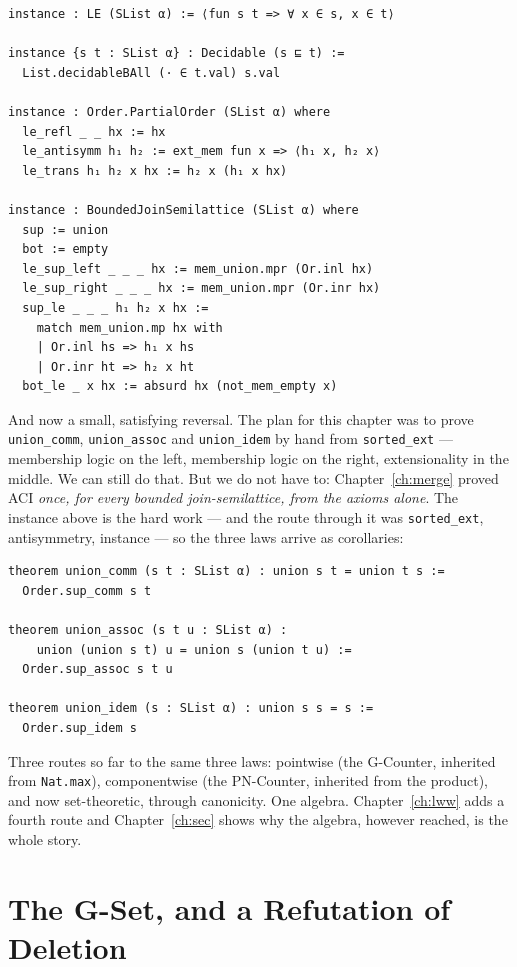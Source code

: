 \documentclass[12pt, a4paper, openright]{book}
\theoremstyle{thmstyle}
\theoremstyle{defstyle}
\newcommand{\lc}[1]{\texttt{#1}}
\begin{document}
\begin{verbatim}
instance : LE (SList α) := ⟨fun s t => ∀ x ∈ s, x ∈ t⟩

instance {s t : SList α} : Decidable (s ⊑ t) :=
  List.decidableBAll (· ∈ t.val) s.val

instance : Order.PartialOrder (SList α) where
  le_refl _ _ hx := hx
  le_antisymm h₁ h₂ := ext_mem fun x => ⟨h₁ x, h₂ x⟩
  le_trans h₁ h₂ x hx := h₂ x (h₁ x hx)

instance : BoundedJoinSemilattice (SList α) where
  sup := union
  bot := empty
  le_sup_left _ _ _ hx := mem_union.mpr (Or.inl hx)
  le_sup_right _ _ _ hx := mem_union.mpr (Or.inr hx)
  sup_le _ _ _ h₁ h₂ x hx :=
    match mem_union.mp hx with
    | Or.inl hs => h₁ x hs
    | Or.inr ht => h₂ x ht
  bot_le _ x hx := absurd hx (not_mem_empty x)
\end{verbatim}

And now a small, satisfying reversal. The plan for this chapter was to
prove \lc{union_comm}, \lc{union_assoc} and \lc{union_idem} by hand from
\lc{sorted_ext} --- membership logic on the left, membership logic on
the right, extensionality in the middle. We can still do that. But we
do not have to: Chapter~\ref{ch:merge} proved ACI \emph{once, for every
bounded join-semilattice, from the axioms alone}. The instance above is
the hard work --- and the route through it was \lc{sorted_ext},
antisymmetry, instance --- so the three laws arrive as corollaries:

\begin{verbatim}
theorem union_comm (s t : SList α) : union s t = union t s :=
  Order.sup_comm s t

theorem union_assoc (s t u : SList α) :
    union (union s t) u = union s (union t u) :=
  Order.sup_assoc s t u

theorem union_idem (s : SList α) : union s s = s :=
  Order.sup_idem s
\end{verbatim}

Three routes so far to the same three laws: pointwise (the G-Counter,
inherited from \lc{Nat.max}), componentwise (the PN-Counter, inherited
from the product), and now set-theoretic, through canonicity. One
algebra. Chapter~\ref{ch:lww} adds a fourth route and
Chapter~\ref{ch:sec} shows why the algebra, however reached, is the
whole story.

\section{The G-Set, and a Refutation of Deletion}
\end{document}
